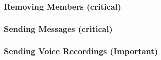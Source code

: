 \documentclass[11pt]{article}
\begin{document}
\subsubsection{Removing Members (critical)}
\subsubsection{Sending Messages (critical)}
\subsubsection{Sending Voice Recordings (Important)}

\end{document}
